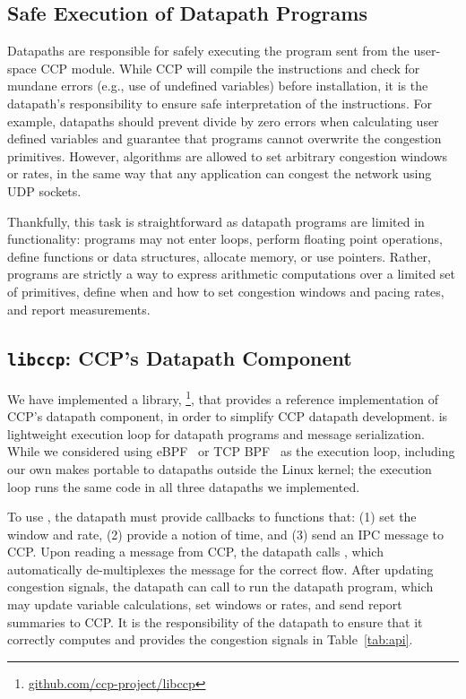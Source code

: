 \subsection{Safe Execution of Datapath Programs}
\label{s:datapath:fold}
Datapaths are responsible for safely executing the program sent from the user-space CCP module. While CCP will compile the instructions and check for mundane errors (e.g., use of undefined variables) before installation, it is the datapath’s responsibility to ensure safe interpretation of the instructions. For example, datapaths should prevent divide by zero errors when calculating user defined variables and guarantee that programs cannot overwrite the congestion primitives. However, algorithms are allowed to set arbitrary congestion windows or rates, in the same way that any application can congest the network using UDP sockets.

Thankfully, this task is straightforward as datapath programs are limited in functionality: 
programs may not enter loops, perform floating point operations, define functions or data structures, allocate memory, or use pointers. Rather, programs are strictly a way to express arithmetic computations over a limited set of primitives, define when and how to set congestion windows and pacing rates, and report measurements.

\subsection{\texttt{libccp}: CCP's Datapath Component}
\label{s:datapath:libccp}
We have implemented a library, \footnote{\url{github.com/ccp-project/libccp}}, that provides a reference
implementation of CCP's datapath component, in order to simplify CCP datapath development.
 is lightweight execution loop for
datapath programs and message serialization. 
While we considered using eBPF~\cite{ebpf} or TCP BPF~\cite{tcpbpf}
as the execution loop, including our own makes  portable to datapaths outside the Linux kernel; the execution loop runs the same code in all three datapaths we implemented.

To use , the datapath must provide callbacks to functions that: (1) set the window and rate, (2) provide a notion of time, and (3) send an IPC message to CCP. Upon reading a message from CCP, the datapath calls , which automatically de-multiplexes the message for the correct flow. After updating congestion signals, the datapath can call  to run the datapath program, which may update variable calculations, set windows or rates,
and send report summaries to CCP. It is the responsibility of the datapath to ensure that it correctly computes and provides the congestion signals in Table~\ref{tab:api}.

